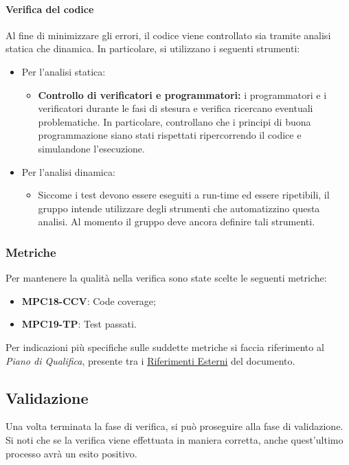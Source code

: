 \paragraph{Verifica del codice}
Al fine di minimizzare gli errori, il codice viene controllato sia tramite analisi statica che dinamica. In particolare, si utilizzano i seguenti strumenti:
\begin{itemize}
    \item Per l'analisi statica: 
        \begin{itemize}
            \item \textbf{Controllo di verificatori e programmatori:} i programmatori e i verificatori durante le fasi di stesura e verifica ricercano eventuali problematiche. In particolare, controllano che i principi di buona programmazione siano stati rispettati ripercorrendo il codice e simulandone l'esecuzione.
        \end{itemize}
    \item Per l'analisi dinamica: 
        \begin{itemize}
            \item Siccome i test devono essere eseguiti a run-time ed essere ripetibili, il gruppo intende utilizzare degli strumenti che automatizzino questa analisi. Al momento il gruppo deve ancora definire tali strumenti.
        \end{itemize}
\end{itemize}

\subsubsection{Metriche}\label{sec:processi_di_supporto:verifica:metriche}
Per mantenere la qualità nella verifica sono state scelte le seguenti metriche:
\begin{itemize}
    \item \textbf{MPC18-CCV}: Code coverage;
    \item \textbf{MPC19-TP}: Test passati.
\end{itemize}
Per indicazioni più specifiche sulle suddette metriche si faccia riferimento al \textit{Piano di Qualifica}, presente tra i \hyperref[sec:riferimenti_esterni]{Riferimenti Esterni} del documento.

\subsection{Validazione}\label{sec:processi_di_supporto:validazione}
Una volta terminata la fase di verifica, si può proseguire alla fase di validazione. Si noti che se la verifica viene effettuata in maniera corretta, anche quest'ultimo processo avrà un esito positivo.

